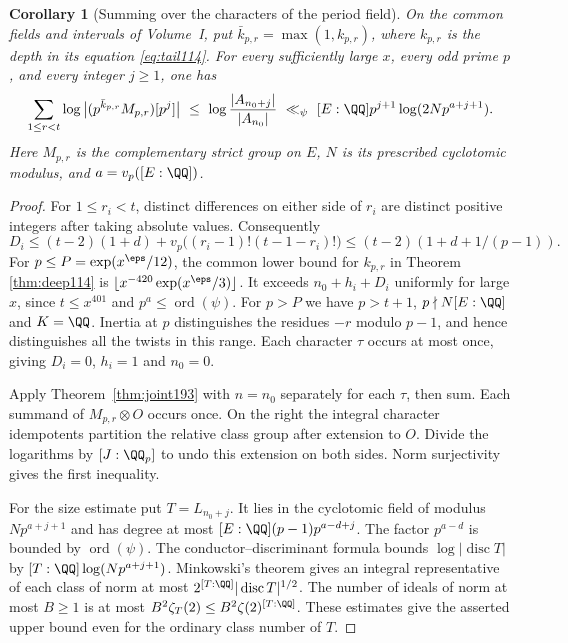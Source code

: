 \documentclass[a4paper,11pt]{article}
\newtheorem{corollary}[proposition]{Corollary}
\theoremstyle{definition}
\theoremstyle{remark}
\numberwithin{equation}{section}
\begin{document}
\begin{corollary}[Summing over the characters of the period field]
\label{cor:joint193}
On the common fields and intervals of Volume~I, put
\(\bar k_{p,r}=\max(1,k_{p,r})\), where \(k_{p,r}\) is the
depth in its equation \eqref{eq:tail114}. For every sufficiently large \(x\),
every odd prime \(p\), and every integer \(j\ge1\), one has
\begin{equation}
 \sum_{1\le r<t}\log\big|(p^{\bar k_{p,r}}M_{p,r})[p^j]\big|
    \ \le\ \log\frac{|A_{n_0+j}|}{|A_{n_0}|}
    \ \ll_\psi\ [E:\QQ]p^{j+1}\log(2Np^{a+j+1}).
 \label{eq:alljoint193}
\end{equation}
Here \(M_{p,r}\) is the complementary strict group on \(E\),
\(N\) is its prescribed cyclotomic modulus, and \(a=v_p([E:\QQ])\).
\end{corollary}
\begin{proof}
For \(1\le r_i<t\), distinct differences on either side of \(r_i\)
are distinct positive integers after taking absolute values.
Consequently
\[
 D_i\le (t-2)(1+d)
       +v_p\big((r_i-1)!(t-1-r_i)!\big)
       \le (t-2)(1+d+1/(p-1)).
\]
For \(p\le P=\exp(x^\eps/12)\), the common lower bound for
\(k_{p,r}\) in Theorem \ref{thm:deep114} is
\(\lfloor x^{-420}\allowbreak\exp(x^\eps/3)\rfloor\). It exceeds
\(n_0+h_i+D_i\) uniformly for large \(x\), since \(t\le x^{401}\)
and \(p^a\le\operatorname{ord}(\psi)\).
For \(p>P\) we have \(p>t+1\), \(p\nmid N[E:\QQ]\) and
\(K=\QQ\). Inertia at \(p\) distinguishes the residues \(-r\)
modulo \(p-1\), and hence distinguishes all the twists in this
range. Each character \(\tau\) occurs at most once, giving
\(D_i=0\), \(h_i=1\) and \(n_0=0\).

Apply Theorem~\ref{thm:joint193} with \(n=n_0\) separately for
each \(\tau\), then sum. Each summand of \(M_{p,r}\otimes O\)
occurs once. On the right the integral character idempotents
partition the relative class group after extension to \(O\).
Divide the logarithms by \([J:\QQ_p]\) to undo this extension
on both sides. Norm surjectivity gives the first inequality.

For the size estimate put \(T=L_{n_0+j}\).
It lies in the cyclotomic field of modulus \(Np^{a+j+1}\)
and has degree at most \([E:\QQ](p-1)p^{a-d+j}\).
The factor \(p^{a-d}\) is bounded by \(\operatorname{ord}(\psi)\).
The conductor--discriminant formula bounds \(\log|\operatorname{disc}T|\)
by \([T:\QQ]\log(Np^{a+j+1})\). Minkowski's theorem gives an
integral representative of each class of norm at most
\(2^{[T:\QQ]}|\operatorname{disc}T|^{1/2}\).
The number of ideals of norm at most \(B\ge1\) is at most
\(B^2\zeta_T(2)\le B^2\zeta(2)^{[T:\QQ]}\).
These estimates give the asserted upper bound even for the
ordinary class number of \(T\).
\end{proof}
\end{document}
